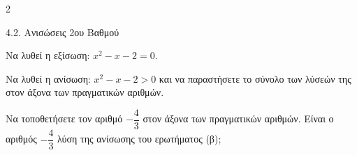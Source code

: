 \begin{ylh}{2}
    \item 4.2. Ανισώσεις 2ου Βαθμού
\end{ylh}

\begin{alist}
\item Να λυθεί η εξίσωση: $x^{2} - x - 2 = 0.$
\item Να λυθεί η ανίσωση: $x^{2} - x - 2 > 0$ και να παραστήσετε το σύνολο των λύσεών της στον άξονα των πραγματικών αριθμών.
\item Να τοποθετήσετε τον αριθμό $- \dfrac{4}{3}$ στον άξονα των πραγματικών αριθμών. Είναι ο αριθμός $- \dfrac{4}{3}$ λύση της ανίσωσης του ερωτήματος (β);
\end{alist}

